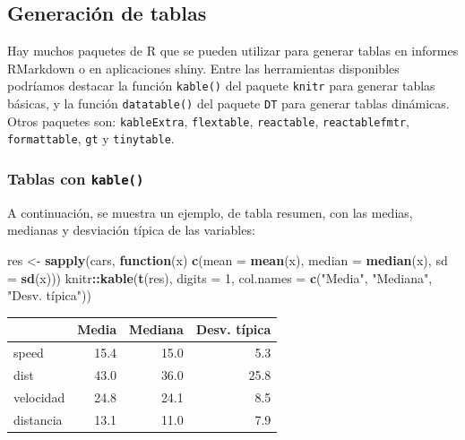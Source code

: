 \documentclass[
]{book}
\newenvironment{Shaded}{\begin{snugshade}}{\end{snugshade}}
\newcommand{\AttributeTok}[1]{\textcolor[rgb]{0.13,0.29,0.53}{#1}}
\newcommand{\ControlFlowTok}[1]{\textcolor[rgb]{0.13,0.29,0.53}{\textbf{#1}}}
\newcommand{\DecValTok}[1]{\textcolor[rgb]{0.00,0.00,0.81}{#1}}
\newcommand{\FunctionTok}[1]{\textcolor[rgb]{0.13,0.29,0.53}{\textbf{#1}}}
\newcommand{\NormalTok}[1]{#1}
\newcommand{\OtherTok}[1]{\textcolor[rgb]{0.56,0.35,0.01}{#1}}
\newcommand{\SpecialCharTok}[1]{\textcolor[rgb]{0.81,0.36,0.00}{\textbf{#1}}}
\newcommand{\StringTok}[1]{\textcolor[rgb]{0.31,0.60,0.02}{#1}}
\theoremstyle{break}
\theoremstyle{nonumberplain}
\begin{document}
\subsection{Generación de tablas}\label{generaciuxf3n-de-tablas}

Hay muchos paquetes de R que se pueden utilizar para generar tablas en informes RMarkdown o en aplicaciones shiny.
Entre las herramientas disponibles podríamos destacar la función \texttt{kable()} del paquete \texttt{knitr} para generar tablas básicas, y la función \texttt{datatable()} del paquete \texttt{DT} para generar tablas dinámicas.
Otros paquetes son:
\texttt{kableExtra}, \texttt{flextable}, \texttt{reactable}, \texttt{reactablefmtr},
\texttt{formattable}, \texttt{gt} y \texttt{tinytable}.

\subsubsection{\texorpdfstring{Tablas con \texttt{kable()}}{Tablas con kable()}}\label{tablas-con-kable}

A continuación, se muestra un ejemplo, de tabla resumen, con las medias, medianas y desviación típica de las variables:

\begin{Shaded}
\begin{Highlighting}[]
\NormalTok{res }\OtherTok{\textless{}{-}} \FunctionTok{sapply}\NormalTok{(cars, }
          \ControlFlowTok{function}\NormalTok{(x) }\FunctionTok{c}\NormalTok{(}\AttributeTok{mean =} \FunctionTok{mean}\NormalTok{(x), }
                        \AttributeTok{median =} \FunctionTok{median}\NormalTok{(x), }
                        \AttributeTok{sd =} \FunctionTok{sd}\NormalTok{(x)))}
\NormalTok{knitr}\SpecialCharTok{::}\FunctionTok{kable}\NormalTok{(}\FunctionTok{t}\NormalTok{(res), }\AttributeTok{digits =} \DecValTok{1}\NormalTok{, }
             \AttributeTok{col.names =} \FunctionTok{c}\NormalTok{(}\StringTok{"Media"}\NormalTok{, }\StringTok{"Mediana"}\NormalTok{, }\StringTok{"Desv. típica"}\NormalTok{))}
\end{Highlighting}
\end{Shaded}

\begin{tabular}{l|r|r|r}
\hline
  & Media & Mediana & Desv. típica\\
\hline
speed & 15.4 & 15.0 & 5.3\\
\hline
dist & 43.0 & 36.0 & 25.8\\
\hline
velocidad & 24.8 & 24.1 & 8.5\\
\hline
distancia & 13.1 & 11.0 & 7.9\\
\hline
\end{tabular}
\end{document}
